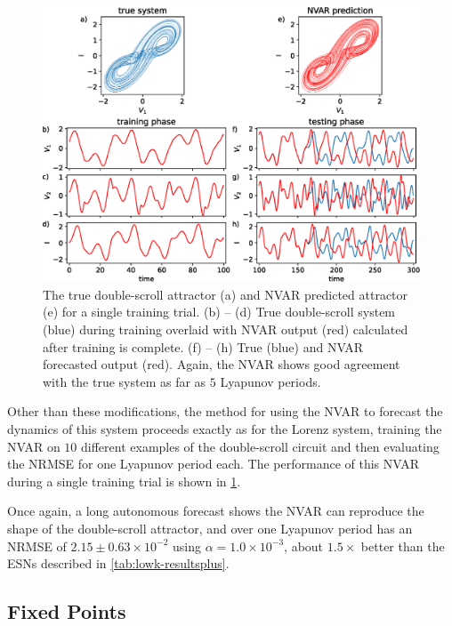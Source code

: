 \begin{figure}
  \includegraphics[width=\textwidth]{figures/nvar-predict-dscroll}
  \caption{The true double-scroll attractor (a) and NVAR predicted
    attractor (e) for a single training trial. (b) -- (d) True
    double-scroll system (blue) during training overlaid with NVAR
    output (red) calculated after training is complete. (f) -- (h)
    True (blue) and NVAR forecasted output (red). Again, the NVAR
    shows good agreement with the true system as far as $5$ Lyapunov
    periods.}
  \label{fig:nvar-predict-dscroll}
\end{figure}

Other than these modifications, the method for using the NVAR to
forecast the dynamics of this system proceeds exactly as for the Lorenz
system, training the NVAR on $10$ different examples of the
double-scroll circuit and then evaluating the NRMSE for one Lyapunov
period each. The performance of this NVAR during a single training
trial is shown in \cref{fig:nvar-predict-dscroll}.

Once again, a long autonomous forecast shows the NVAR can reproduce
the shape of the double-scroll attractor, and over one Lyapunov period
has an NRMSE of $2.15\pm0.63\times10^{-2}$ using $\alpha =
1.0\times10^{-3}$, about $1.5\times$ better than the ESNs
described in \cref{tab:lowk-resultsplus}.

\subsection{Fixed Points}

